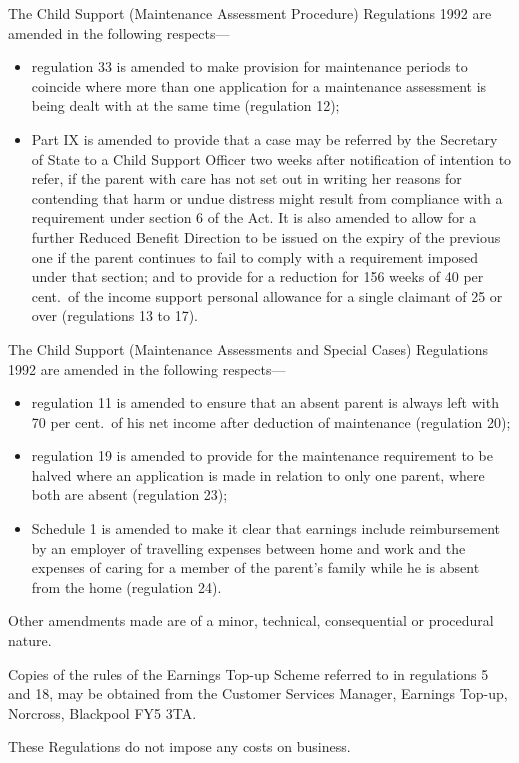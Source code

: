 \documentclass[a4paper]{article}
\begin{document}
  The Child Support (Maintenance Assessment Procedure) Regulations 1992 are amended in the following respects—
\begin{itemize}
\item regulation 33 is amended to make provision for maintenance periods to coincide where more than one application for a maintenance assessment is being dealt with at the same time (regulation 12);

\item Part IX is amended to provide that a case may be referred by the Secretary of State to a Child Support Officer two weeks after notification of intention to refer, if the parent with care has not set out in writing her reasons for contending that harm or undue distress might result from compliance with a requirement under section 6 of the Act. It is also amended to allow for a further Reduced Benefit Direction to be issued on the expiry of the previous one if the parent continues to fail to comply with a requirement imposed under that section; and to provide for a reduction for 156 weeks of 40 per cent.\ of the income support personal allowance for a single claimant of 25 or over (regulations 13 to 17).
\end{itemize}

  The Child Support (Maintenance Assessments and Special Cases) Regulations 1992 are amended in the following respects—
\begin{itemize}
\item regulation 11 is amended to ensure that an absent parent is always left with 70 per cent.\ of his net income after deduction of maintenance (regulation 20);

\item regulation 19 is amended to provide for the maintenance requirement to be halved where an application is made in relation to only one parent, where both are absent (regulation 23);

\item Schedule 1 is amended to make it clear that earnings include reimbursement by an employer of travelling expenses between home and work and the expenses of caring for a member of the parent’s family while he is absent from the home (regulation 24).
\end{itemize}

  Other amendments made are of a minor, technical, consequential or procedural nature.

  Copies of the rules of the Earnings Top-up Scheme referred to in regulations 5 and 18, may be obtained from the Customer Services Manager, Earnings Top-up, Norcross, Blackpool \textsc{FY5 3TA}.

  These Regulations do not impose any costs on business.
\end{document}
